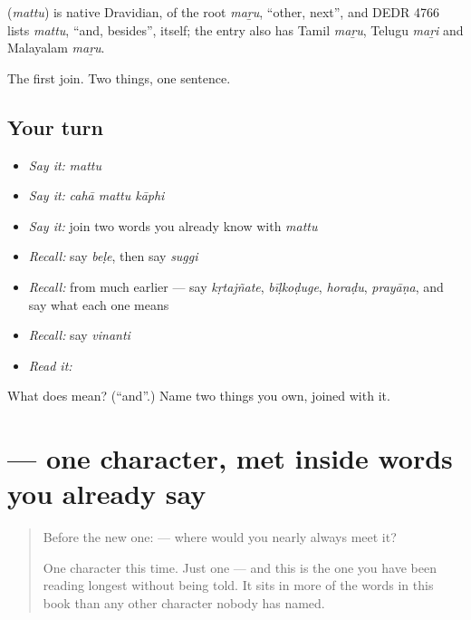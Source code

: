 \begin{cousinweb}
\textbf{} (\emph{mattu}) is native Dravidian, of the root \emph{maṟu}, \textquotedblleft{}other, next\textquotedblright{}, and DEDR 4766 lists \emph{mattu}, \textquotedblleft{}and, besides\textquotedblright{}, itself; the entry also has Tamil \emph{maṟu}, Telugu \emph{maṟi} and Malayalam \emph{maṟu}.
\end{cousinweb}

\begin{grammarlens}[title={What you've built}]
The first join. Two things, one sentence.
\end{grammarlens}

\subsection*{Your turn}
\begin{itemize}
\raggedright
  \item \emph{Say it:} \emph{mattu}
  \item \emph{Say it:} \emph{cahā mattu kāphi}
  \item \emph{Say it:} join two words you already know with \emph{mattu}
  \item \emph{Recall:} say \emph{beḷe}, then say \emph{suggi}
  \item \emph{Recall:} from much earlier — say \emph{kṛtajñate}, \emph{bīḷkoḍuge}, \emph{horaḍu}, \emph{prayāṇa}, and say what each one means
  \item \emph{Recall:} say \emph{vinanti}
  \item \emph{Read it:} \textbf{}
\end{itemize}

\begin{tcolorbox}[breakable,colback=teal!4,colframe=teal!35!black,title={Before you move on}]
What does  mean? (\textquotedblleft{}and\textquotedblright{}.) Name two things you own, joined with it.
\end{tcolorbox}
\section[\texorpdfstring{\kn{ಮ} (ma)}{ಮ (ma)}]{ — one character, met inside words you already say}

\label{lesson:KA-S134-letter-ma}



\begin{quote}
Before the new one:  — where would you nearly always meet it?

One character this time. Just one — and this is the one you have been reading longest without being told. It sits in more of the words in this book than any other character nobody has named.
\end{quote}

